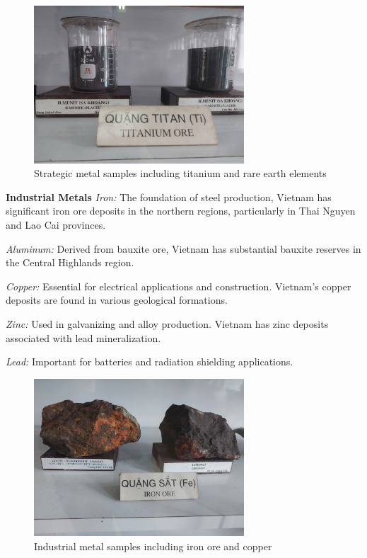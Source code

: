 \begin{figure}[H]
\centering
\includegraphics[width=0.7\textwidth]{graphics/strategic_metals.png}
\caption{Strategic metal samples including titanium and rare earth elements}
\label{fig:strategic_metals}
\end{figure}

\textbf{Industrial Metals}
\textit{Iron:} The foundation of steel production, Vietnam has significant iron ore deposits in the northern regions, particularly in Thai Nguyen and Lao Cai provinces.

\textit{Aluminum:} Derived from bauxite ore, Vietnam has substantial bauxite reserves in the Central Highlands region.

\textit{Copper:} Essential for electrical applications and construction. Vietnam's copper deposits are found in various geological formations.

\textit{Zinc:} Used in galvanizing and alloy production. Vietnam has zinc deposits associated with lead mineralization.

\textit{Lead:} Important for batteries and radiation shielding applications.

\begin{figure}[H]
\centering
\includegraphics[width=0.7\textwidth]{graphics/industrial_metals.png}
\caption{Industrial metal samples including iron ore and copper}
\label{fig:industrial_metals}
\end{figure}

